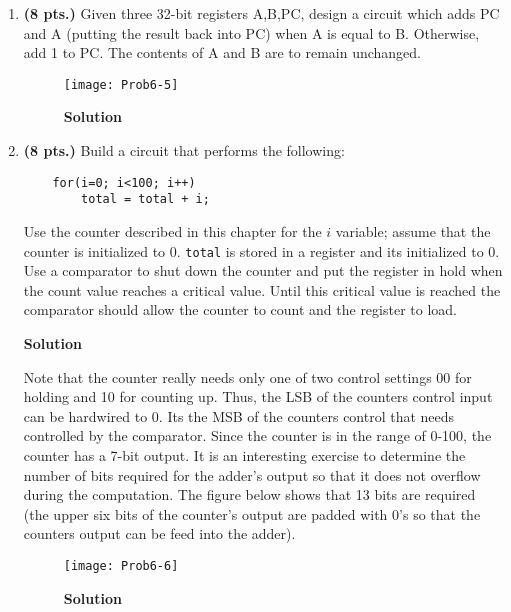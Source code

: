 \begin{enumerate}
        \ifshowanswers\needspace{2in}\fi
    \item \textbf{ (8 pts.)} Given three 32-bit registers A,B,PC, design a circuit
        which adds PC and A (putting the result back into PC) when A is equal
        to B.  Otherwise, add 1 to PC.  The contents of A and B
        are to remain unchanged.

        \begin{onlysolution} \itshape{
                \begin{figure}[ht]
                    \caption{\textbf{Solution}}
                    \texttt{[image: Prob6-5]}
                \end{figure}
            }
        \end{onlysolution}

        \ifshowanswers\needspace{2in}\fi %
    \item \textbf{ (8 pts.)} Build a circuit that performs the following:
\begin{verbatim}
    for(i=0; i<100; i++)
        total = total + i;
\end{verbatim}
        Use the counter described in this chapter for the $i$ variable;
        assume that the counter is initialized to 0. \verb^total^ is stored
        in a register and its initialized to 0.  Use a comparator to shut
        down the counter and put the register in hold when the count value
        reaches a critical value. Until this critical value is
        reached the comparator should allow the counter to count and the
        register to load.

        \begin{onlysolution}  \textbf{Solution} \itshape{
                Note that the counter really needs only one of two control settings
                00 for holding and 10 for counting up.  Thus, the LSB of the counters
                control input can be hardwired to 0.  Its the MSB of the counters control
                that needs controlled by the comparator.  Since the counter is in the
                range of 0-100, the counter has a 7-bit output.  It is an interesting exercise to
                determine the number of bits required for the adder's output so that it
                does not overflow during the computation.  The figure below shows that
                13 bits are required (the upper six bits of the counter's output are padded
                with 0's so that the counters output can be feed into the adder).
                \needspace{2.08in}
                \begin{figure}[ht]
                    \caption{\textbf{Solution}}
                    \texttt{[image: Prob6-6]}
                \end{figure}
            }
        \end{onlysolution}


\end{enumerate}
